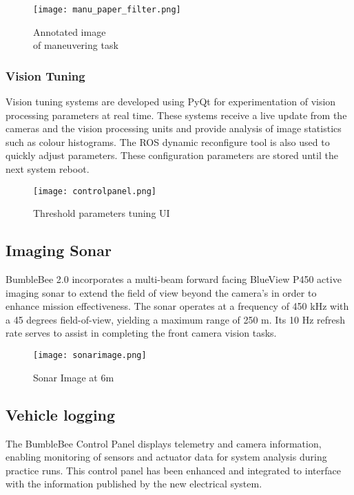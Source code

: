 \documentclass[journal,12pt]{IEEEtran}
\begin{document}
\begin{figure}[h]
\centering
\texttt{[image: manu\_paper\_filter.png]}
\caption{Annotated image \\ of maneuvering task}
\captionsetup{justification=centering}
\label{fig:image_manu}
\end{figure}

\subsubsection{Vision Tuning}
Vision tuning systems are developed using PyQt for experimentation of vision processing parameters at real time. These systems receive a live update from the cameras and the vision processing units and provide analysis of image statistics such as colour histograms. The ROS dynamic reconfigure tool is also used to quickly adjust parameters. These configuration parameters are stored until the next system reboot.  

\begin{figure}[h]
\centering
\texttt{[image: controlpanel.png]}
\caption{Threshold parameters tuning UI}
\end{figure}

\subsection{Imaging Sonar}
BumbleBee 2.0 incorporates a multi-beam forward facing BlueView P450 active imaging sonar to extend the field of view beyond the camera's in order to enhance mission effectiveness. The sonar operates at a frequency of 450 kHz with a 45 degrees field-of-view, yielding a maximum range of 250 m. Its 10 Hz refresh rate serves to assist in completing the front camera vision tasks.

\begin{figure}[h]
\centering
\texttt{[image: sonarimage.png]}
\caption{Sonar Image at 6m}
\captionsetup{justification=centering}
\end{figure}

\subsection{Vehicle logging}
The BumbleBee Control Panel displays telemetry and camera information, enabling monitoring of sensors and actuator data for system analysis during practice runs. This control panel has been enhanced and integrated to interface with the information published by the new electrical system. 
\end{document}
